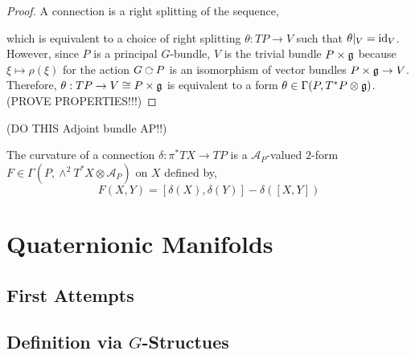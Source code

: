 \documentclass[12pt]{extarticle}
\begin{document}
\begin{proof}
A connection is a right splitting of the sequence,
\begin{center}
\end{center}
which is equivalent to a choice of right splitting $\theta : TP \to V$ such that $\theta|_V = \mathrm{id}_{V}$. However, since $P$ is a principal $G$-bundle, $V$ is the trivial bundle $P \times \mathfrak{g}$ because $\xi \mapsto \rho(\xi)$ for the action $G \acts P$ is an isomorphism of vector bundles $P \times \mathfrak{g} \to V$. Therefore, $\theta : TP \to V \cong P \times \mathfrak{g}$ is equivalent to a form $\theta \in \Gamma(P, T^*P \otimes \mathfrak{g})$.
(PROVE PROPERTIES!!!)
\end{proof}

(DO THIS Adjoint bundle AP!!)

\newcommand{\A}{\mathcal{A}}

\begin{defn}
The curvature of a connection $\delta : \pi^* TX \to TP$ is a $\A_P$-valued $2$-form $F \in \Gamma(P, \wedge^2 T^* X \otimes \A_P)$ on $X$ defined by,
\[ F(X, Y) = [\delta(X), \delta(Y)] - \delta([X, Y]) \]
\end{defn}




\section{Quaternionic Manifolds}

\renewcommand{\H}{\mathbb{H}}
\renewcommand{\End}[2]{\mathrm{End}_{#1}\left(#2\right)}
\renewcommand{\Aut}[2]{\mathrm{Aut}_{#1}\left(#2\right)}
\newcommand{\GL}[1]{\mathrm{GL}\left(#1 \right)}

\subsection{First Attempts}

\subsection{Definition via $G$-Structues}
\end{document}
